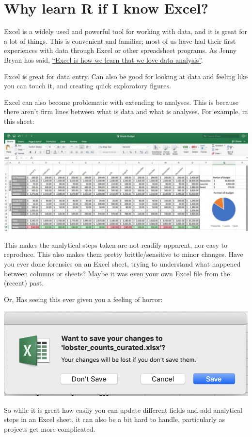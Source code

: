 \documentclass[]{book}
\begin{document}
\hypertarget{why-learn-r-if-i-know-excel}{%
\section{Why learn R if I know Excel?}\label{why-learn-r-if-i-know-excel}}

Excel is a widely used and powerful tool for working with data, and it is great for a lot of things. This is convenient and familiar; most of us have had their first experiences with data through Excel or other spreadsheet programs. As Jenny Bryan has said, \href{}{``Excel is how we learn that we love data analysis''}.

Excel is great for data entry. Can also be good for looking at data and feeling like you can touch it, and creating quick exploratory figures.

Excel can also become problematic with extending to analyses. This is because there aren't firm lines between what is data and what is analyses. For example, in this sheet:

\includegraphics[width=0.7\linewidth]{img/excel-sheet-example}

This makes the analytical steps taken are not readily apparent, nor easy to reproduce. This also makes them pretty brittle/sensitive to minor changes. Have you ever done forensics on an Excel sheet, trying to understand what happened between columns or sheets? Maybe it was even your own Excel file from the (recent) past.

Or, Has seeing this ever given you a feeling of horror:

\includegraphics[width=0.8\linewidth]{img/want-to-save-changes-excel}

So while it is great how easily you can update different fields and add analytical steps in an Excel sheet, it can also be a bit hard to handle, particularly as projects get more complicated.
\end{document}
